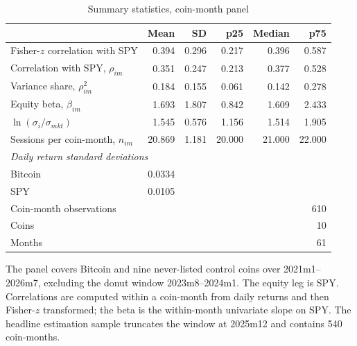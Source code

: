 \begin{table}[t]
\centering
\begin{threeparttable}
\caption{Summary statistics, coin-month panel}
\label{tab:sumstats}
\begin{tabular}{lrrrrr}
\toprule
& Mean & SD & p25 & Median & p75 \\
\midrule
Fisher-$z$ correlation with SPY & 0.394 & 0.296 & 0.217 & 0.396 & 0.587 \\ %
Correlation with SPY, $\rho_{im}$ & 0.351 & 0.247 & 0.213 & 0.377 & 0.528 \\ %
Variance share, $\rho_{im}^2$ & 0.184 & 0.155 & 0.061 & 0.142 & 0.278 \\ %
Equity beta, $\beta_{im}$ & 1.693 & 1.807 & 0.842 & 1.609 & 2.433 \\ %
$\ln(\sigma_i/\sigma_{mkt})$ & 1.545 & 0.576 & 1.156 & 1.514 & 1.905 \\ %
Sessions per coin-month, $n_{im}$ & 20.869 & 1.181 & 20.000 & 21.000 & 22.000 \\ %
\midrule
\multicolumn{6}{l}{\emph{Daily return standard deviations}} \\
Bitcoin & 0.0334 & & & & \\ %
SPY & 0.0105 & & & & \\ %
\midrule
Coin-month observations & \multicolumn{5}{r}{610} \\ %
Coins & \multicolumn{5}{r}{10} \\ %
Months & \multicolumn{5}{r}{61} \\ %
\bottomrule
\end{tabular}
\begin{tablenotes}[flushleft]
\footnotesize
\item The panel covers Bitcoin and nine never-listed control coins over 2021m1--2026m7, excluding the donut window 2023m8--2024m1. The equity leg is SPY. Correlations are computed within a coin-month from daily returns and then Fisher-$z$ transformed; the beta is the within-month univariate slope on SPY. The headline estimation sample truncates the window at 2025m12 and contains 540 coin-months.
\end{tablenotes}
\end{threeparttable}
\end{table}
